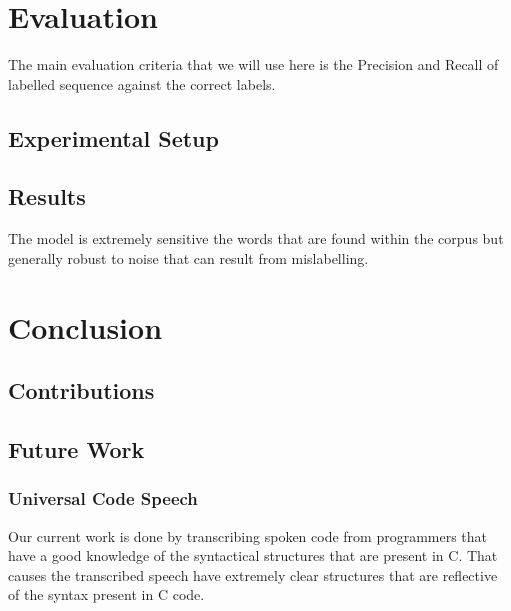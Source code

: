 \documentclass[fyp]{socreport}
\begin{document}
\chapter{Evaluation}
The main evaluation criteria that we will use here is the Precision and Recall
of labelled sequence against the correct labels.


\section{Experimental Setup}

\section{Results}


The model is extremely sensitive the words that are found within the corpus but
generally robust to noise that can result from mislabelling.




\chapter{Conclusion}

\section{Contributions}


\section{Future Work}

\subsection{Universal Code Speech}
Our current work is done by transcribing spoken code from programmers that have
a good knowledge of the syntactical structures that are present in C. That
causes the transcribed speech have extremely clear structures that are
reflective of the syntax present in C code.
\end{document}
